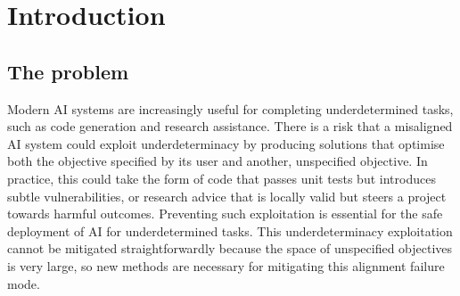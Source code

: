 \section{Introduction}

\subsection{The problem}

Modern AI systems are increasingly useful for completing underdetermined tasks, such as code generation and research assistance.
There is a risk that a misaligned AI system could exploit underdeterminacy by producing solutions that optimise both the objective specified by its user and another, unspecified objective. In practice, this could take the form of code that passes unit tests but introduces subtle vulnerabilities, or research advice that is locally valid but steers a project towards harmful outcomes. Preventing such exploitation is essential for the safe deployment of AI for underdetermined tasks.
This underdeterminacy exploitation cannot be mitigated straightforwardly because the space of unspecified objectives is very large, so new methods are necessary for mitigating this alignment failure mode.


